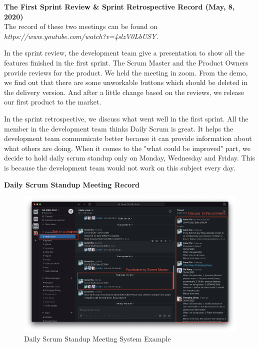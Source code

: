 \documentclass{report}
\begin{document}
\textbf{The First Sprint Review \& Sprint Retrospective Record (May, 8, 2020)}
\\
The record of these two meetings can be found on \textit{https://www.youtube.com/watch?v=4slzV0LbUSY}.

In the sprint review, the development team give a presentation to show all the features finished in the first sprint. The Scrum Master and the Product Owners provide reviews for the product. We held the meeting in zoom. From the demo, we find out that there are some unworkable buttons which should be deleted in the delivery version. And after a little change based on the reviews, we release our first product to the market.

In the sprint retrospective, we discuss what went well in the first sprint. All the member in the development team thinks Daily Scrum is great. It helps the development team communicate better because it can provide information about what others are doing. When it comes to the "what could be improved" part, we decide to hold daily scrum standup only on Monday, Wednesday and Friday. This is because the development team would not work on this subject every day.


\clearpage
\textbf{Daily Scrum Standup Meeting Record}
\\
\begin{figure}[htp]
\centering
\includegraphics[width=\textwidth]{Figures/dailyScrum.png}
\caption{Daily Scrum Standup Meeting System Example}
\label{fig:dailyScrum}
\end{figure}
\end{document}
